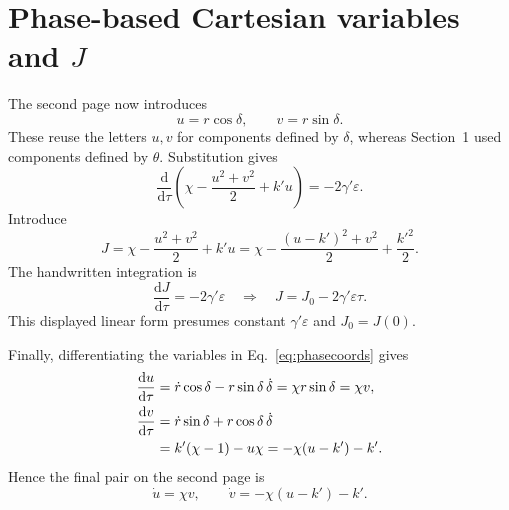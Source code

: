 \documentclass[11pt,a4paper]{article}
\newcommand{\dd}{\mathrm{d}}
\begin{document}
\newpage
\section{Phase-based Cartesian variables and $J$}
The second page now introduces
\begin{equation}
u=r\cos\delta,\qquad v=r\sin\delta.
\label{eq:phasecoords}
\end{equation}
These reuse the letters $u,v$ for components defined by $\delta$, whereas
Section~1 used components defined by $\theta$.
Substitution gives
\begin{equation}
\frac{\dd}{\dd\tau}
\left(\chi-\frac{u^2+v^2}{2}+k'u\right)
=-2\gamma'\varepsilon.
\end{equation}
Introduce
\begin{equation}
\boxed{J=\chi-\frac{u^2+v^2}{2}+k'u
=\chi-\frac{(u-k')^2+v^2}{2}+\frac{k'^2}{2}.}
\end{equation}
The handwritten integration is
\begin{equation}
\frac{\dd J}{\dd\tau}=-2\gamma'\varepsilon
\quad\Longrightarrow\quad
\boxed{J=J_0-2\gamma'\varepsilon\tau.}
\end{equation}
This displayed linear form presumes constant $\gamma'\varepsilon$ and
$J_0=J(0)$.

Finally, differentiating the variables in Eq.~\eqref{eq:phasecoords} gives
\begin{align}
\frac{\dd u}{\dd\tau}
&=\dot r\cos\delta-r\sin\delta\,\dot\delta
=\chi r\sin\delta=\chi v,\\
\frac{\dd v}{\dd\tau}
&=\dot r\sin\delta+r\cos\delta\,\dot\delta\notag\\
&=k'(\chi-1)-u\chi
=-\chi(u-k')-k'.
\end{align}
Hence the final pair on the second page is
\begin{equation}
\boxed{\dot u=\chi v,\qquad \dot v=-\chi(u-k')-k'.}
\end{equation}
\end{document}
